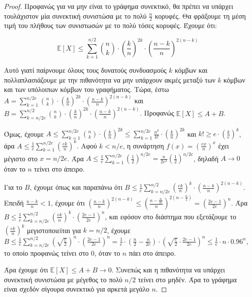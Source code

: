 \documentclass[a4paper, oneside, 11pt]{article}
\theoremstyle{definition}
\newcommand{\ex}{\mathbb{E}}
\begin{document}
\begin{enumerate}
   \begin{proof}
Προφανώς για να μην είναι το γράφημα συνεκτικό, θα πρέπει να υπάρχει τουλάχιστον μία συνεκτική συνιστώσα με το πολύ $\frac{n}{2}$ κορυφές. Θα φράξουμε τη μέση τιμή του πλήθους των συνιστωσών με το πολύ
τόσες κορυφές. Έχουμε ότι:

\[ \ex[X] \leq \sum_{k=1}^{n/2} {n \choose k} \cdot \left(\frac{k}{n}\right)^{2k} \cdot
\left(\frac{n-k}{n}\right)^{2(n-k)} \]

Αυτό γιατί παίρνουμε όλους τους δυνατούς συνδυασμούς $k$ κόμβων και
πολλαπλασιάζουμε με την πιθανότητα να μην υπάρχουν ακμές μεταξύ των $k$ κόμβων και των υπόλοιπων κόμβων του γραφήματος. Τώρα, έστω $A = \sum_{k=1}^{n/2e} {n\choose k} \cdot (\frac{k}{n})^{2k}
 \cdot (\frac{n-k}{n})^{2(n-k)}$ και $B = \sum_{k=n/2e}^{n/2} {n\choose k} \cdot (\frac{k}{n})^{2k}
 \cdot (\frac{n-k}{n})^{2(n-k)}$.
Προφανώς $\ex[X] \leq A + B$.

Όμως, έχουμε $A \leq \sum_{k=1}^{n/2e} {n\choose k} \cdot (\frac{k}{n})^{2k} \leq \sum_{k=1}^{n/2e} \frac{n^k}{k!} \cdot (\frac{k}{n})^{2k}$ και $k! \geq e \cdot
(\frac{k}{e})^k$, άρα $A \leq \frac{1}{e} \sum_{k=1}^{n/2e} (\frac{ek}{n})^k$. Αφού $k<n/e$, η συνάρτηση $f(x) = (\frac{ex}{n})^x$ έχει μέγιστο στο $x=n/2e$. Άρα $A \leq  \frac{1}{e} \sum_{k=1}^{n/2e}
(\frac{1}{2})^{n/2e} = \frac{n}{2e^2} (\frac{1}{2})^{n/2e}$, δηλαδή $A\rightarrow 0$ όταν το $n$ τείνει στο άπειρο.

Για το $B$, έχουμε όπως και παραπάνω ότι $B\leq \frac{1}{e} \sum_{k=n/2e}^{n/2} (\frac{ek}{n})^k \cdot (\frac{n-k}{n})^{2(n-k)}$. Επειδή $\frac{n-k}{n}<1$, έχουμε ότι $(\frac{n-k}{n})^{2(n-k)}
\leq (\frac{n-\frac{n}{2e}}{n})^{2(n-\frac{n}{2})} = (\frac{2e-1}{2e})^n$. Άρα $B \leq \frac{1}{e} \sum_{k=n/2e}^{n/2} (\frac{ek}{n})^k \cdot (\frac{2e-1}{2e})^n$, και εφόσον στο διάστημα που εξετάζουμε
το $(\frac{ek}{n})^k$ μεγιστοποιείται για $k=n/2$, έχουμε $B \leq \frac{1}{e} \sum_{k=n/2e}^{n/2} (\sqrt{\frac{e}{2}})^n \cdot (\frac{2e-1}{2e})^n = \frac{1}{e} \cdot (\frac{n}{2} - \frac{n}{2e}) \cdot
(\sqrt{\frac{e}{2}}\cdot \frac{2e-1}{2e})^n \leq \frac{1}{e} \cdot n \cdot 0.96^n$, το οποίο προφανώς τείνει στο 0, όταν το $n$ πάει στο άπειρο.

Άρα έχουμε ότι $\ex[X]\leq A + B \rightarrow 0$. Συνεπώς
και η πιθανότητα να υπάρχει συνεκτική συνιστώσα με μέγεθος το πολύ $n/2$ τείνει στο μηδέν. Άρα το γράφημα είναι σχεδόν σίγουρα συνεκτικό για αρκετά μεγάλο $n$.


   \end{proof}

\end{enumerate}
\end{document}
